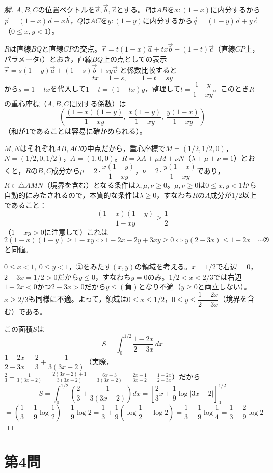 \documentclass[../main.tex]{subfiles}
\begin{document}
\begin{proof}[解]
  $A,B,C$の位置ベクトルを$\vec a,\vec b,\vec c$とする。$P$は$AB$を$x:(1-x)$に内分するから$\vec p=(1-x)\vec a+x\vec b$，$Q$は$AC$を$y:(1-y)$に内分するから$\vec q=(1-y)\vec a+y\vec c$（$0\le x,y<1$）。

  $R$は直線$BQ$と直線$CP$の交点。$\vec r=t(1-x)\vec a+tx\vec b+(1-t)\vec c$（直線$CP$上，パラメータ$t$）とおき，直線$BQ$上の点としての表示 $\vec r=s(1-y)\vec a+(1-s)\vec b+sy\vec c$ と係数比較すると
  \[
    tx=1-s,\qquad 1-t=sy
  \]
  から$s=1-tx$を代入して$1-t=(1-tx)y$，整理して$t=\dfrac{1-y}{1-xy}$。このとき$R$の重心座標（$A,B,C$に関する係数）は
  \[
    \left(\frac{(1-x)(1-y)}{1-xy},\ \frac{x(1-y)}{1-xy},\ \frac{y(1-x)}{1-xy}\right)
  \]
  （和が$1$であることは容易に確かめられる）。

  $M,N$はそれぞれ$AB,AC$の中点だから，重心座標で$M=(1/2,1/2,0)$，$N=(1/2,0,1/2)$，$A=(1,0,0)$。$R=\lambda A+\mu M+\nu N$（$\lambda+\mu+\nu=1$）とおくと，$R$の$B,C$成分から$\mu=2\cdot\dfrac{x(1-y)}{1-xy}$，$\nu=2\cdot\dfrac{y(1-x)}{1-xy}$であり，$R\in\triangle AMN$（境界を含む）となる条件は$\lambda,\mu,\nu\ge0$。$\mu,\nu\ge0$は$0\le x,y<1$から自動的にみたされるので，本質的な条件は$\lambda\ge0$，すなわち$R$の$A$成分が$1/2$以上であること：
  \[
    \frac{(1-x)(1-y)}{1-xy}\ge\frac12
  \]
  （$1-xy>0$に注意して）これは
  \[
    2(1-x)(1-y)\ge1-xy \iff 1-2x-2y+3xy\ge0 \iff y(2-3x)\le1-2x \quad\cdots\text{②}
  \]
  と同値。

  $0\le x<1,\ 0\le y<1$，②をみたす$(x,y)$の領域を考える。$x=1/2$で右辺$=0$，$2-3x=1/2>0$だから$y\le0$，すなわち$y=0$のみ。$1/2<x<2/3$では右辺$1-2x<0$かつ$2-3x>0$だから$y\le(\text{負})$となり不適（$y\ge0$と両立しない）。$x\ge2/3$も同様に不適。よって，領域は$0\le x\le1/2$，$0\le y\le\dfrac{1-2x}{2-3x}$（境界を含む）である。

  この面積$S$は
  \[
    S=\int_0^{1/2}\frac{1-2x}{2-3x}\,dx
  \]
  $\dfrac{1-2x}{2-3x}=\dfrac23+\dfrac1{3(3x-2)}$（実際，$\frac23+\frac1{3(3x-2)}=\frac{2(3x-2)+1}{3(3x-2)}=\frac{6x-3}{3(3x-2)}=\frac{2x-1}{3x-2}=\frac{1-2x}{2-3x}$）だから
  \[
    S=\int_0^{1/2}\left(\frac23+\frac1{3(3x-2)}\right)dx=\left[\frac23x+\frac19\log|3x-2|\right]_0^{1/2}
  \]
  \[
    =\left(\frac13+\frac19\log\frac12\right)-\frac19\log2=\frac13+\frac19\left(\log\frac12-\log2\right)=\frac13+\frac19\log\frac14=\frac13-\frac29\log2
  \]
\end{proof}

\newpage

\section*{第4問}
\end{document}
